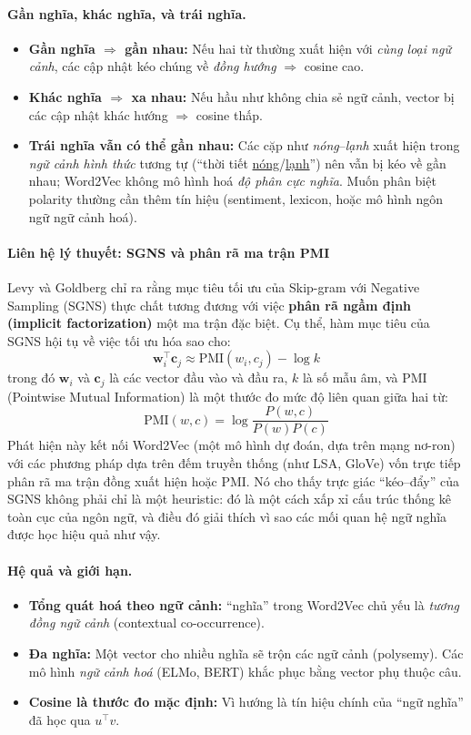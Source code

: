 \paragraph{Gần nghĩa, khác nghĩa, và trái nghĩa.}
\begin{itemize}
    \item \textbf{Gần nghĩa $\Rightarrow$ gần nhau:} Nếu hai từ thường xuất hiện với \emph{cùng loại ngữ cảnh}, các cập nhật kéo chúng về \emph{đồng hướng} $\Rightarrow$ cosine cao.
    \item \textbf{Khác nghĩa $\Rightarrow$ xa nhau:} Nếu hầu như không chia sẻ ngữ cảnh, vector bị các cập nhật khác hướng $\Rightarrow$ cosine thấp.
    \item \textbf{Trái nghĩa vẫn có thể gần nhau:} Các cặp như \textit{nóng}--\textit{lạnh} xuất hiện trong \emph{ngữ cảnh hình thức} tương tự (``thời tiết \underline{nóng}/\underline{lạnh}'') nên vẫn bị kéo về gần nhau; Word2Vec không mô hình hoá \emph{độ phân cực nghĩa}. Muốn phân biệt polarity thường cần thêm tín hiệu (sentiment, lexicon, hoặc mô hình ngôn ngữ ngữ cảnh hoá).
\end{itemize}

\paragraph{Liên hệ lý thuyết: SGNS và phân rã ma trận PMI}
Levy và Goldberg \cite{levy2014neural} chỉ ra rằng mục tiêu tối ưu của Skip-gram với Negative Sampling (SGNS) thực chất tương đương với việc \textbf{phân rã ngầm định (implicit factorization)} một ma trận đặc biệt.  Cụ thể, hàm mục tiêu của SGNS hội tụ về việc tối ưu hóa sao cho:
\[ \mathbf{w}_i^\top \mathbf{c}_j \approx \text{PMI}(w_i, c_j) - \log k \]
trong đó $\mathbf{w}_i$ và $\mathbf{c}_j$ là các vector đầu vào và đầu ra, $k$ là số mẫu âm, và PMI (Pointwise Mutual Information) là một thước đo mức độ liên quan giữa hai từ:
\[ \text{PMI}(w, c) = \log \frac{P(w, c)}{P(w)P(c)} \]
Phát hiện này kết nối Word2Vec (một mô hình dự đoán, dựa trên mạng nơ-ron) với các phương pháp dựa trên đếm truyền thống (như LSA, GloVe) vốn trực tiếp phân rã ma trận đồng xuất hiện hoặc PMI. Nó cho thấy trực giác “kéo--đẩy” của SGNS không phải chỉ là một heuristic: đó là một cách xấp xỉ cấu trúc thống kê toàn cục của ngôn ngữ, và điều đó giải thích vì sao các mối quan hệ ngữ nghĩa được học hiệu quả như vậy.

\paragraph{Hệ quả và giới hạn.}
\begin{itemize}
    \item \textbf{Tổng quát hoá theo ngữ cảnh:} ``nghĩa'' trong Word2Vec chủ yếu là \emph{tương đồng ngữ cảnh} (contextual co-occurrence).
    \item \textbf{Đa nghĩa:} Một vector cho nhiều nghĩa sẽ trộn các ngữ cảnh (polysemy). Các mô hình \emph{ngữ cảnh hoá} (ELMo, BERT) khắc phục bằng vector phụ thuộc câu.
    \item \textbf{Cosine là thước đo mặc định:} Vì hướng là tín hiệu chính của ``ngữ nghĩa'' đã học qua $u^\top v$.
\end{itemize}

